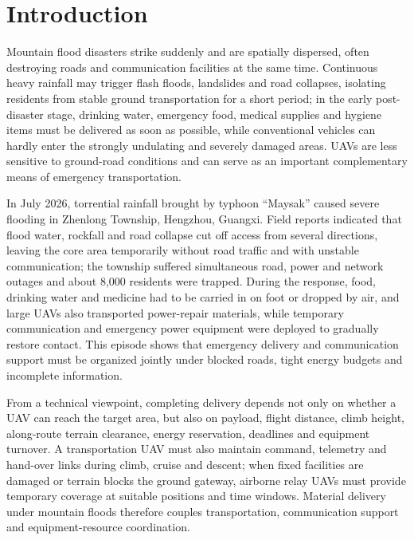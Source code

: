 \documentclass[journal]{IEEEtran}
\begin{document}
\section{Introduction}
Mountain flood disasters strike suddenly and are spatially dispersed, often
destroying roads and communication facilities at the same time. Continuous heavy
rainfall may trigger flash floods, landslides and road collapses, isolating
residents from stable ground transportation for a short period; in the early
post-disaster stage, drinking water, emergency food, medical supplies and
hygiene items must be delivered as soon as possible, while conventional vehicles
can hardly enter the strongly undulating and severely damaged areas. UAVs are
less sensitive to ground-road conditions and can serve as an important
complementary means of emergency transportation.

In July 2026, torrential rainfall brought by typhoon ``Maysak'' caused severe
flooding in Zhenlong Township, Hengzhou, Guangxi. Field reports indicated that
flood water, rockfall and road collapse cut off access from several directions,
leaving the core area temporarily without road traffic and with unstable
communication; the township suffered simultaneous road, power and network
outages and about 8,000 residents were trapped. During the response, food,
drinking water and medicine had to be carried in on foot or dropped by air, and
large UAVs also transported power-repair materials, while temporary
communication and emergency power equipment were deployed to gradually restore
contact. This episode shows that emergency delivery and communication support
must be organized jointly under blocked roads, tight energy budgets and
incomplete information.

From a technical viewpoint, completing delivery depends not only on whether a
UAV can reach the target area, but also on payload, flight distance, climb
height, along-route terrain clearance, energy reservation, deadlines and
equipment turnover. A transportation UAV must also maintain
command, telemetry and hand-over links during climb, cruise and
descent; when fixed facilities are damaged or terrain blocks the
ground gateway, airborne relay UAVs must provide temporary coverage at suitable
positions and time windows. Material delivery under mountain floods therefore
couples transportation, communication support and equipment-resource
coordination.
\end{document}
